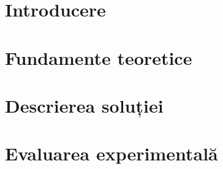 \documentclass[12pt,a4paper]{report}
\newcommand\blankpage{%
	\null
	\thispagestyle{empty}%
	\addtocounter{page}{-1}%
	\newpage}
\begin{document}
\afterpage{\blankpage}

\restoregeometry

\setcounter{page}{3}


\newpage


\tableofcontents

\newpage
{}
\listoffigures

\newpage
{}
\listoftables

\newpage\null\newpage
\chapter{Introducere}


\newpage\null\newpage
\chapter{Fundamente teoretice}


\newpage\null\newpage
\chapter{Descrierea soluției}


\newpage\null\newpage
\chapter{Evaluarea experimentală}



\end{document}
